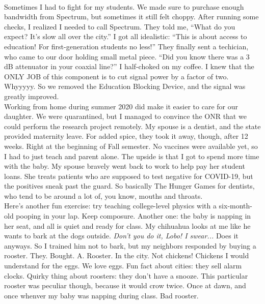\documentclass[../../main.tex]{subfiles}
\begin{document}
\\
\vspace{0.25cm}
Sometimes I had to fight for my students.  We made sure to purchase enough bandwidth from Spectrum, but sometimes it still felt choppy.  After running some checks, I realized I needed to call Spectrum.  They told me, ``What do you expect?  It's slow all over the city.''  I got all idealistic: ``This is about access to education!  For first-generation students no less!'' They finally sent a techician, who came to our door holding small metal piece.  ``Did you know there was a 3 dB attenuator in your coaxial line?''  I half-choked on my coffee.  I knew that the ONLY JOB of this component is to cut signal power by a factor of two.  Whyyyyy.  So we removed the Education Blocking Device, and the signal was greatly improved.
\\
\vspace{0.25cm}
Working from home during summer 2020 did make it easier to care for our daughter.  We were quarantined, but I managed to convince the ONR that we could perform the research project remotely.  My spouse is a dentist, and the state provided maternity leave.  For added spice, they took it away, though, after 12 weeks.  Right at the beginning of Fall semester.  No vaccines were available yet, so I had to just teach and parent alone.  The upside is that I got to spend more time with the baby.  My spouse bravely went back to work to help pay her student loans.  She treats patients who are supposed to test negative for COVID-19, but the positives sneak past the guard.  So basically The Hunger Games for dentists, who tend to be around a lot of, you know, mouths and throats.
\\
\vspace{0.25cm}
Here's another fun exercise: try teaching college-level physics with a six-month-old pooping in your lap.  Keep composure.  Another one: the baby is napping in her seat, and all is quiet and ready for class.  My chihuahua looks at me like he wants to bark at the dogs outside.  \textit{Don't you do it, Lobo!  I swear...} Does it anyways.  So I trained him not to bark, but my neighbors responded by buying a rooster.  They. Bought. A. Rooster.  In the city.  Not chickens!  Chickens I would understand for the eggs.  We love eggs.  Fun fact about cities: they sell alarm clocks.  Quirky thing about roosters: they don't have a snooze.  This particular rooster was peculiar though, because it would crow twice.  Once at dawn, and once whenver my baby was napping during class.  Bad rooster.
\\
\end{document}

